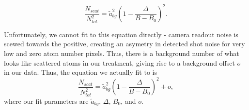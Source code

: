 \documentclass[12pt]{iopart}
\begin{document}
\begin{equation}
\frac{N_{scat}}{N_{tot}^2}=\tilde{a}_{bg}^2\left(1-\frac{\Delta}{B-B_0}\right)^2.
\end{equation}
\par Unfortunately, we cannot fit to this equation directly - camera readout noise is scewed towards the positive, creating an asymetry in detected shot noise for very low and zero atom number pixels. Thus, there is a background number of what looks like scattered atoms in our treatment, giving rise to a background offset $o$ in our data. Thus, the equation we actually fit to is
\begin{equation}
\frac{N_{scat}}{N_{tot}^2}=\tilde{a}_{bg}^2\left(1-\frac{\Delta}{B-B_0}\right)^2 + o,
\label{eq13}
\end{equation}
where our fit parameters are $\tilde{a}_{bg}$, $\Delta$, $B_0$, and $o$. 
\end{document}
